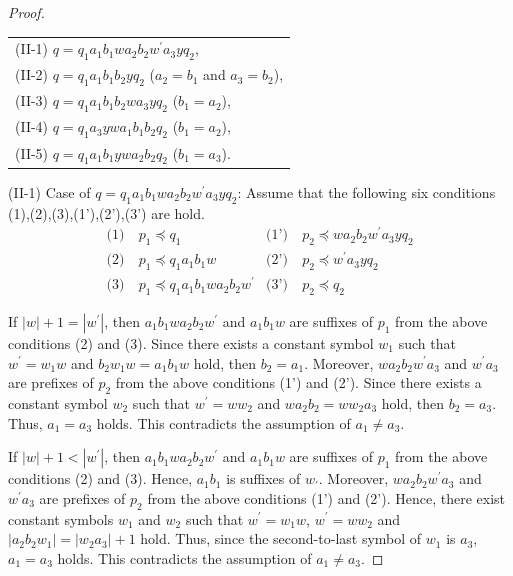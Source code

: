 \begin{proof}
\begin{tabular}{l}
(II-1) $q=q_{1}a_{1}b_{1}wa_{2}b_{2}w^{\prime}a_{3}yq_{2}$,\\
(II-2) $q=q_{1}a_{1}b_{1}b_{2}yq_{2}$ ($a_{2}=b_{1}$ and $a_{3}=b_{2}$),\\
(II-3) $q=q_{1}a_{1}b_{1}b_{2}wa_{3}yq_{2}$ ($b_{1}=a_{2}$),\\
(II-4) $q=q_{1}a_{3}ywa_{1}b_{1}b_{2}q_{2}$ ($b_{1}=a_{2}$),\\
(II-5) $q=q_{1}a_{1}b_{1}ywa_{2}b_{2}q_{2}$ ($b_{1}=a_{3}$).
\end{tabular}

\smallskip
\noindent
(II-1) Case of $q=q_{1}a_{1}b_{1}wa_{2}b_{2}w^{\prime}a_{3}yq_{2}$:
Assume that the following six conditions (1),(2),(3),(1'),(2'),(3') are hold.
\begin{align*}
\textrm{(1)}~& p_{1} \preceq q_{1} & \textrm{(1')}~& p_{2} \preceq wa_{2}b_{2}w^{\prime}a_{3}yq_{2} \\
\textrm{(2)}~& p_{1} \preceq q_{1}a_{1}b_{1}w & \textrm{(2')}~& p_{2} \preceq w^{\prime}a_{3}yq_{2} \\
\textrm{(3)}~& p_{1} \preceq q_{1}a_{1}b_{1}wa_{2}b_{2}w^{\prime} & \textrm{(3')}~& p_{2} \preceq q_{2}
\end{align*}

If $|w|+1=|w^{\prime}|$, then $a_{1}b_{1}wa_{2}b_{2}w^{\prime}$ and $a_{1}b_{1}w$ are suffixes of $p_{1}$ from the above conditions (2) and (3).
Since there exists a constant symbol $w_{1}$ such that $w^{\prime}=w_{1}w$ and $b_{2}w_{1}w=a_{1}b_{1}w$ hold,
then $b_{2}=a_{1}$.
Moreover, $wa_{2}b_{2}w^{\prime}a_{3}$ and $w^{\prime}a_{3}$ are prefixes of $p_{2}$ from the above conditions (1') and (2').
Since there exists a constant symbol $w_{2}$ such that $w^{\prime}=ww_{2}$ and $wa_{2}b_{2}=ww_{2}a_{3}$ hold,
then $b_{2}=a_{3}$.
Thus, $a_{1} = a_{3}$ holds.
This contradicts the assumption of $a_{1} \ne a_{3}$.

If $|w|+1 < |w^{\prime}|$, then $a_{1}b_{1}wa_{2}b_{2}w^{\prime}$ and $a_{1}b_{1}w$ are suffixes of $p_{1}$ from the above conditions (2) and (3).
Hence, $a_{1}b_{1}$ is suffixes of $w_{\prime}$.
Moreover, $wa_{2}b_{2}w^{\prime}a_{3}$ and $w^{\prime}a_{3}$ are prefixes of $p_{2}$ from the above conditions (1') and (2').
Hence, there exist constant symbols $w_{1}$ and $w_{2}$ such that $w^{\prime}=w_{1}w$, $w^{\prime}=ww_{2}$ and $|a_{2}b_{2}w_{1}|=|w_{2}a_{3}|+1$ hold.
Thus, since the second-to-last symbol of $w_{1}$ is $a_{3}$, $a_{1}=a_{3}$ holds.
This contradicts the assumption of $a_{1} \ne a_{3}$.


\end{proof}
